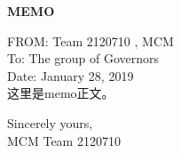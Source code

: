 \documentclass[13pt]{ctexart} %
\begin{document}
\newpage
\setmainfont{texgyrepagella-regular.otf}
\thispagestyle{empty}
{\centering \fontsize{18pt}{14pt}\selectfont \textbf{MEMO}\par}

\noindent FROM: Team {} 2120710 , MCM\\
\noindent To: The group of Governors\\
\noindent Date: January 28, 2019
\vspace{10pt}
\\
这里是memo正文。

\thispagestyle{empty}
{\raggedleft
Sincerely yours,\\
MCM Team 2120710\par
}

\newpage
\thispagestyle{empty}
\tableofcontents
\newpage
\setcounter{page}{1}
\end{document}
